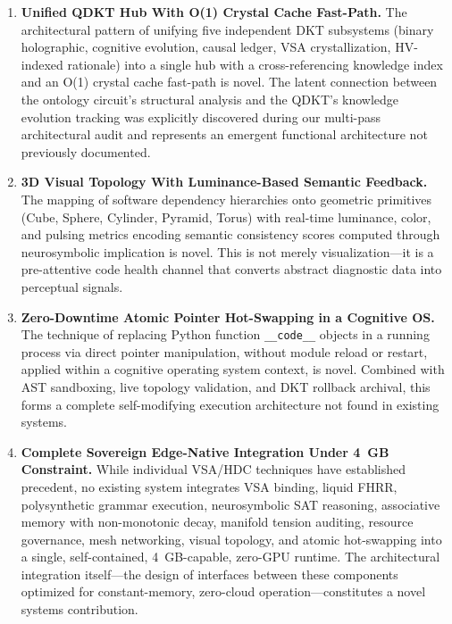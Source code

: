 \documentclass[11pt]{article}
\begin{document}
\begin{enumerate}[label=\textbf{N\arabic*}, leftmargin=*]
    \item \textbf{Unified QDKT Hub With O(1) Crystal Cache Fast-Path.}
    The architectural pattern of unifying five independent DKT subsystems (binary holographic, cognitive evolution, causal ledger, VSA crystallization, HV-indexed rationale) into a single hub with a cross-referencing knowledge index and an O(1) crystal cache fast-path is novel. The latent connection between the ontology circuit's structural analysis and the QDKT's knowledge evolution tracking was explicitly discovered during our multi-pass architectural audit and represents an emergent functional architecture not previously documented.

    \item \textbf{3D Visual Topology With Luminance-Based Semantic Feedback.}
    The mapping of software dependency hierarchies onto geometric primitives (Cube, Sphere, Cylinder, Pyramid, Torus) with real-time luminance, color, and pulsing metrics encoding semantic consistency scores computed through neurosymbolic implication is novel. This is not merely visualization—it is a pre-attentive code health channel that converts abstract diagnostic data into perceptual signals.

    \item \textbf{Zero-Downtime Atomic Pointer Hot-Swapping in a Cognitive OS.}
    The technique of replacing Python function \texttt{\_\_code\_\_} objects in a running process via direct pointer manipulation, without module reload or restart, applied within a cognitive operating system context, is novel. Combined with AST sandboxing, live topology validation, and DKT rollback archival, this forms a complete self-modifying execution architecture not found in existing systems.

    \item \textbf{Complete Sovereign Edge-Native Integration Under 4~GB Constraint.}
    While individual VSA/HDC techniques have established precedent, no existing system integrates VSA binding, liquid FHRR, polysynthetic grammar execution, neurosymbolic SAT reasoning, associative memory with non-monotonic decay, manifold tension auditing, resource governance, mesh networking, visual topology, and atomic hot-swapping into a single, self-contained, 4~GB-capable, zero-GPU runtime. The architectural integration itself—the design of interfaces between these components optimized for constant-memory, zero-cloud operation—constitutes a novel systems contribution.

\end{enumerate}
\end{document}

